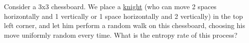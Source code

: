 \documentclass[a4paper,10pt,landscape,twocolumn]{scrartcl}
\begin{document}









\begin{exercise}
Consider a 3x3 chessboard. We place a \href{https://en.wikipedia.org/wiki/Knight_(chess)}{knight} (who can move 2 spaces horizontally and 1 vertically or 1 space horizontally and 2 vertically) in the top left corner, and let him perform a random walk on this chessboard, choosing his move uniformly random every time. What is the entropy rate of this process?
\end{exercise}
\end{document}
